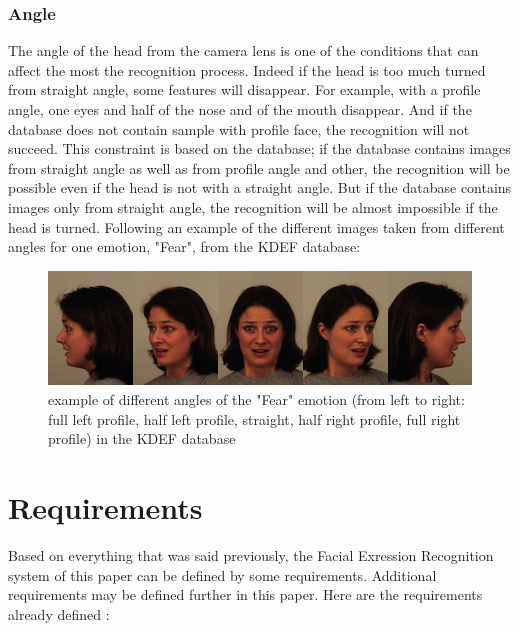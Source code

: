 \subsubsection{Angle}

\vspace{\baselineskip}
\noindent The angle of the head from the camera lens is one of the conditions that can affect the most the recognition process. Indeed if the head is too much turned from straight angle, some features will disappear. For example, with a profile angle, one eyes and half of the nose and of the mouth disappear. And if the database does not contain sample with profile face, the recognition will not succeed. This constraint is based on the database; if the database contains images from straight angle as well as from profile angle and other, the recognition will be possible even if the head is not with a straight angle. But if the database contains images only from straight angle, the recognition will be almost impossible if the head is turned. Following an example of the different images taken from different angles for one emotion, "Fear", from the KDEF database:
\newline

\begin{figure}[!h]
\begin{center}
\noindent \includegraphics[scale=0.8]{figures/kdef_example_angle} 
\newline
\caption{example of different angles of the "Fear" emotion (from left to right: full left profile, half left profile, straight, half right profile, full right profile) in the KDEF database}
\label{kdef_example_angle}
\end{center} 
\end{figure}

\section{Requirements}

\vspace{\baselineskip}
\noindent Based on everything that was said previously, the Facial Exression Recognition system of this paper can be defined by some requirements. Additional requirements may be defined further in this paper. Here are the requirements already defined :
\newline

